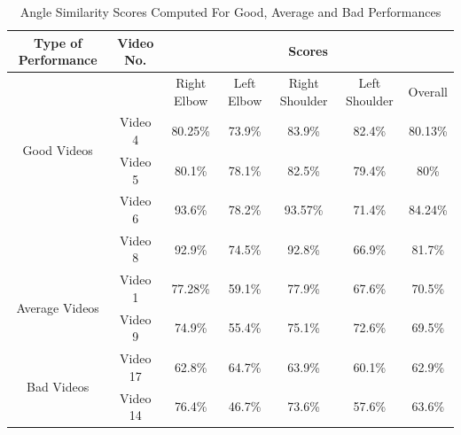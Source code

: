 \begin{table}
  \begin{adjustbox}{width=\columnwidth,center}
  \begin{tabular}{|c|c|c|c|c|c|c|}
    \hline
    Type of Performance & Video No. & \multicolumn{5}{c}{Scores}   \\
        \hline
        \hline
         {} & {} & Right Elbow & Left Elbow & Right Shoulder & Left Shoulder & Overall \\
        \hline
        \multirow{2}{*}{Good Videos} 
          & Video 4 & 80.25\% & 73.9\% & 83.9\% & 82.4\% & 80.13\%   \\ \cline{2-7}
          & Video 5 & 80.1\% & 78.1\% & 82.5\% & 79.4\% & 80\% \\ \cline{2-7}
          & Video 6 & 93.6\% & 78.2\% & 93.57\% & 71.4\% & 84.24\% \\ \cline{2-7}
          & Video 8 & 92.9\% & 74.5\% & 92.8\% & 66.9\% & 81.7\% \\ \cline{2-7}
          \hline

          \multirow{2}{*}{Average Videos} 
          & Video 1 & 77.28\% & 59.1\% & 77.9\% & 67.6\% & 70.5\%   \\ \cline{2-7}
          & Video 9 & 74.9\% & 55.4\% & 75.1\% & 72.6\% & 69.5\% \\ \cline{2-7}
          \hline

          \multirow{2}{*}{Bad Videos} 
          & Video 17 & 62.8\% & 64.7\% & 63.9\% & 60.1\% & 62.9\%   \\ \cline{2-7}
          & Video 14 & 76.4\% & 46.7\% & 73.6\% & 57.6\% & 63.6\% \\ \cline{2-7}
          \hline
  \end{tabular}
\end{adjustbox}
\caption{Angle Similarity Scores Computed For Good, Average and Bad Performances}
\label{table:AngleScores}
\end{table}

